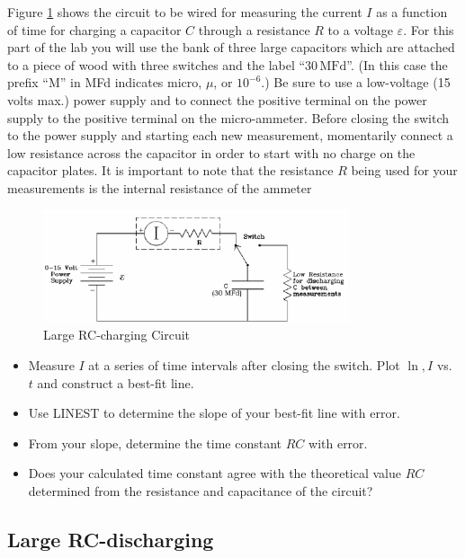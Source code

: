 Figure \ref{fig:largerccharge} shows the circuit to be wired for measuring the current $I$ as a function of time for charging a capacitor $C$ through a resistance $R$ to a voltage $\varepsilon$. For this part of the lab you will use the bank of three large capacitors which are attached to a piece of wood with three switches and the label ``$30\,\mathrm{MFd}$''. (In this case the prefix ``M'' in MFd indicates micro, $\mu$, or $10^{-6}$.) Be sure to use a low-voltage (15 volts max.) power supply and to connect the positive terminal on the power supply to the positive terminal on the micro-ammeter. Before closing the switch to the power supply and starting each new measurement, momentarily connect a low resistance across the capacitor in order to start with no charge on the capacitor plates. It is important to note that the resistance $R$ being used for your measurements is the internal resistance of the ammeter\myskip
\begin{figure}[h]
   \begin{center}
       \includegraphics[width=0.8\textwidth]{./Exp3/pic/image6.png}
   \end{center}
   \caption{Large RC-charging Circuit}
   \label{fig:largerccharge}
\end{figure}

\begin{itemize}
  \item Measure $I$ at a series of time intervals after closing the switch. Plot $\ln,I$ vs. $t$ and construct a best-fit line.
  \item Use LINEST to determine the slope of your best-fit line with error.
  \item From your slope, determine the time constant $RC$ with error.
  \item Does your calculated time constant agree with the theoretical value $RC$ determined from the resistance and capacitance of the circuit?
\end{itemize}

\subsection{Large RC-discharging}

